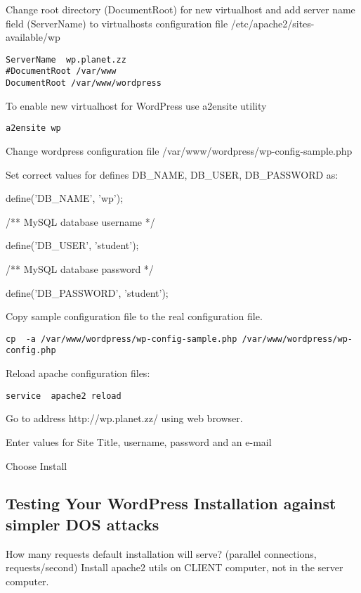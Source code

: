 Change root directory (DocumentRoot) for new virtualhost and add server name field (ServerName) to virtualhosts configuration file   /etc/apache2/sites-available/wp


\begin{verbatim}
ServerName	wp.planet.zz
#DocumentRoot /var/www
DocumentRoot /var/www/wordpress
\end{verbatim}


To enable new virtualhost for WordPress use a2ensite utility
\begin{verbatim}
a2ensite wp
\end{verbatim}

Change wordpress configuration file
/var/www/wordpress/wp-config-sample.php

Set correct values for defines DB\_NAME, DB\_USER, DB\_PASSWORD as:

define('DB\_NAME', 'wp');

/** MySQL database username */

define('DB\_USER', 'student');

/** MySQL database password */

define('DB\_PASSWORD', 'student');


Copy sample configuration file to the real configuration file.
\begin{verbatim}
cp  -a /var/www/wordpress/wp-config-sample.php /var/www/wordpress/wp-config.php
\end{verbatim}

Reload apache configuration files:
\begin{verbatim}
service  apache2 reload
\end{verbatim}

Go to address http://wp.planet.zz/ using web browser.

Enter values for  Site Title, username, password and an e-mail

Choose Install

\subsection{Testing Your WordPress Installation against simpler DOS attacks}


How many requests default installation will serve? (parallel connections, requests/second)
Install apache2 utils on CLIENT computer, not in the server computer.

